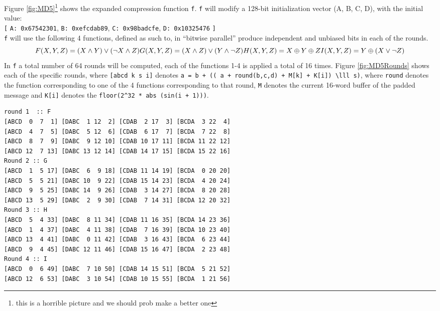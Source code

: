 \documentclass[a4paper]{article}
\begin{document}
\begin{enumerate}
Figure \ref{fig:MD5}\footnote{this is a horrible picture and we should prob make a better one} shows the expanded compression function \texttt{f}. \texttt{f} will modify a 128-bit initialization vector (A, B, C, D), with the initial value:\\
\texttt{[} \texttt{A: 0x67542301}, \texttt{B: 0xefcdab89}, \texttt{C: 0x98badcfe}, \texttt{D: 0x10325476} \texttt{]}\\
\texttt{f} will use the following 4 functions, defined as such to, in ``bitwise parallel'' produce independent and unbiased bits in each of the rounds.
\begin{equation}
F(X, Y, Z) = (X \wedge Y) \vee (\neg X \wedge Z) \\
G(X, Y, Z) = (X \wedge Z) \vee (Y \wedge \neg Z) \\
H(X, Y, Z) = X \oplus Y \oplus Z \\
I(X, Y, Z) = Y \oplus ( X \vee \neg Z) \\
\end{equation}
In \texttt{f} a total number of 64 rounds will be computed, each of the functions 1-4 is applied a total of 16 times. Figure \ref{fig:MD5Rounds} shows each of the specific rounds, where \texttt{[abcd k s i]} denotes \texttt{a = b + (( a + round(b,c,d) + M[k] + K[i]) \textbackslash{}lll s)}, where \texttt{round} denotes the function corresponding to one of the 4 functions corresponding to that round, \texttt{M} denotes the current 16-word buffer of the padded message and \texttt{K[i]} denotes the \texttt{floor(2\textasciicircum{}32 * abs (sin(i + 1)))}.
\begin{verbatim}
round 1  :: F
[ABCD  0  7  1] [DABC  1 12  2] [CDAB  2 17  3] [BCDA  3 22  4]
[ABCD  4  7  5] [DABC  5 12  6] [CDAB  6 17  7] [BCDA  7 22  8]
[ABCD  8  7  9] [DABC  9 12 10] [CDAB 10 17 11] [BCDA 11 22 12]
[ABCD 12  7 13] [DABC 13 12 14] [CDAB 14 17 15] [BCDA 15 22 16]
Round 2 :: G
[ABCD  1  5 17] [DABC  6  9 18] [CDAB 11 14 19] [BCDA  0 20 20]
[ABCD  5  5 21] [DABC 10  9 22] [CDAB 15 14 23] [BCDA  4 20 24]
[ABCD  9  5 25] [DABC 14  9 26] [CDAB  3 14 27] [BCDA  8 20 28]
[ABCD 13  5 29] [DABC  2  9 30] [CDAB  7 14 31] [BCDA 12 20 32]
Round 3 :: H
[ABCD  5  4 33] [DABC  8 11 34] [CDAB 11 16 35] [BCDA 14 23 36]
[ABCD  1  4 37] [DABC  4 11 38] [CDAB  7 16 39] [BCDA 10 23 40]
[ABCD 13  4 41] [DABC  0 11 42] [CDAB  3 16 43] [BCDA  6 23 44]
[ABCD  9  4 45] [DABC 12 11 46] [CDAB 15 16 47] [BCDA  2 23 48]
Round 4 :: I
[ABCD  0  6 49] [DABC  7 10 50] [CDAB 14 15 51] [BCDA  5 21 52]
[ABCD 12  6 53] [DABC  3 10 54] [CDAB 10 15 55] [BCDA  1 21 56]

\end{verbatim}
\end{enumerate}
\end{document}
